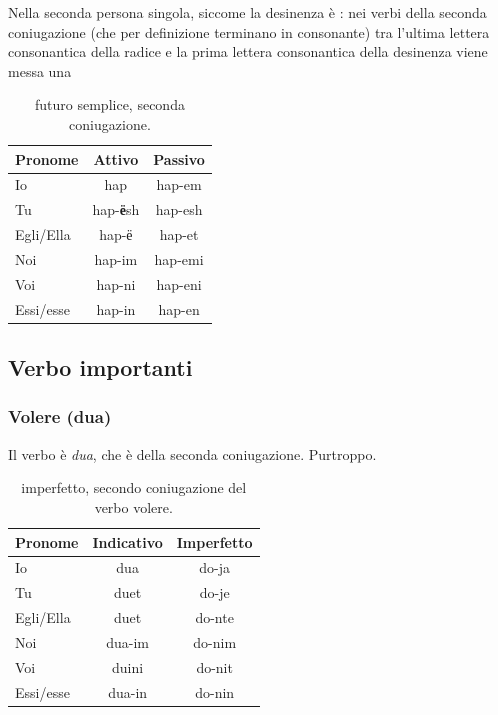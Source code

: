 Nella seconda persona singola, siccome la desinenza è : nei verbi della seconda coniugazione (che per definizione terminano in consonante) tra l'ultima lettera consonantica della radice e la prima lettera consonantica della desinenza viene messa una 

\begin{table}[H]
    \centering
    \begin{tabular}{lcc}
        \toprule
        Pronome     &   Attivo & Passivo \\
        \midrule
        Io          &   hap & hap-em \\
        Tu          &   hap-\textbf{ё}sh & hap-esh \\
        Egli/Ella   &   hap-ё & hap-et \\
        Noi         &   hap-im & hap-emi \\
        Voi         &   hap-ni & hap-eni \\
        Essi/esse   &   hap-in & hap-en \\
        \bottomrule
    \end{tabular}
    \caption{futuro semplice, seconda coniugazione.}
    \label{tbl:verb:primaconiugazione:futurosemplice}
\end{table}


\subsection{Verbo importanti}

\subsubsection{Volere (dua)}

Il verbo è \textit{dua}, che è della seconda coniugazione. Purtroppo.

\begin{table}[H]
    \centering
    \begin{tabular}{lcc}
        \toprule
        Pronome     &   Indicativo & Imperfetto \\
        \midrule
        Io          &   dua & do-ja \\
        Tu          &   duet & do-je \\
        Egli/Ella   &   duet & do-nte \\
        Noi         &   dua-im & do-nim \\
        Voi         &   duini & do-nit \\
        Essi/esse   &   dua-in & do-nin \\
        \bottomrule
    \end{tabular}
    \caption{imperfetto, secondo coniugazione del verbo volere.}
    \label{tbl:verb:secondaconiugazione:imperfetto}
\end{table}

